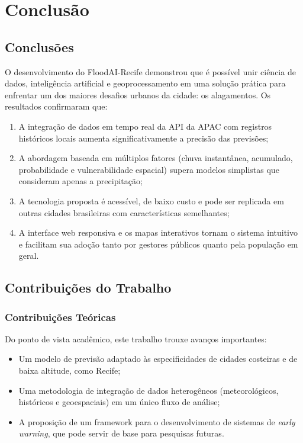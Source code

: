 \chapter{Conclusão}

\section{Conclusões}

O desenvolvimento do FloodAI-Recife demonstrou que é possível unir ciência de dados, inteligência artificial e geoprocessamento em uma solução prática para enfrentar um dos maiores desafios urbanos da cidade: os alagamentos. Os resultados confirmaram que:

\begin{enumerate}
    \item A integração de dados em tempo real da API da APAC com registros históricos locais aumenta significativamente a precisão das previsões;
    \item A abordagem baseada em múltiplos fatores (chuva instantânea, acumulado, probabilidade e vulnerabilidade espacial) supera modelos simplistas que consideram apenas a precipitação;
    \item A tecnologia proposta é acessível, de baixo custo e pode ser replicada em outras cidades brasileiras com características semelhantes;
    \item A interface web responsiva e os mapas interativos tornam o sistema intuitivo e facilitam sua adoção tanto por gestores públicos quanto pela população em geral.
\end{enumerate}

\section{Contribuições do Trabalho}

\subsection{Contribuições Teóricas}

Do ponto de vista acadêmico, este trabalho trouxe avanços importantes:
\begin{itemize}
    \item Um modelo de previsão adaptado às especificidades de cidades costeiras e de baixa altitude, como Recife;
    \item Uma metodologia de integração de dados heterogêneos (meteorológicos, históricos e geoespaciais) em um único fluxo de análise;
    \item A proposição de um framework para o desenvolvimento de sistemas de \textit{early warning}, que pode servir de base para pesquisas futuras.
\end{itemize}

